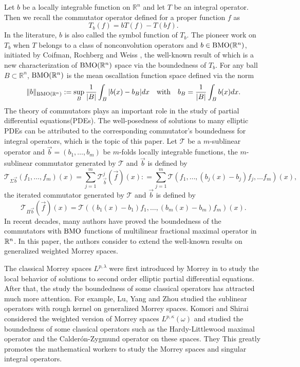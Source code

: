 \documentclass[11pt, twoside, leqno]{article}
\begin{document}
Let $b$ be a locally integrable function on $\mathbb{R}^{n}$ and let $T$ be an integral operator. Then we recall the commutator operator defined for a proper function $f$ as
$$T_{b}(f)=bT(f)-T(bf).$$
In the literature, $b$ is also called the symbol function of $T_{b}$.  The pioneer work on $T_{b}$ when $T$ belongs to a class of nonconvolution operators and $b\in {\rm BMO}(\mathbb{R}^{n})$, initiated by Coifman, Rochberg and Weiss \cite{Coifman1976Factorization}, the well-known result of which is a new characterization of ${\rm BMO}(\mathbb{R}^{n})$ space via the boundedness of $T_{b}$. For any ball $B\subset \mathbb{R}^{n}$, ${\rm BMO}(\mathbb{R}^{n})$ is the mean oscallation function space defined via the norm
$$\|b\|_{{\rm BMO}(\mathbb{R}^{n})}:=\sup_{B}\frac{1}{|B|}\int_{B}|b(x)-b_{B}|dx\quad\text{with}\quad b_{B}=\frac{1}{|B|}\int_{B}b(x)dx.$$
The theory of commutators plays an important role in the study of partial differential equations(PDEs).  The well-posedness of
solutions to many elliptic PDEs can be attributed to the corresponding commutator's boundedness for integral operators, which is the topic of this paper. Let $\mathcal{T}$ be a $m$-sublinear operator and  $\vec{b}=(b_1,\ldots,b_m)$ be $m$-folds locally integrable functions, the $m$-sublinear commutator generated by  $\mathcal{T}$ and $\vec{b}$ is defined by
\begin{equation*}
{\mathcal{T}_{\Sigma \vec b}}({f_1}, \ldots ,{f_m})(x) =\sum\limits_{j = 1}^m {\mathcal{T}_{\vec b}^j} (\vec f)(x): = \sum\limits_{j = 1}^m {\mathcal{T}({f_1}, \ldots ,({b_j}(x) - {b_j}){f_j}, \ldots {f_m})(x)},
\end{equation*}
the iterated commutator generated by  $\mathcal{T}$ and $\vec{b}$ is defined by
\begin{equation*}
{\mathcal{T}_{\Pi \vec b}}(\vec f)(x) = \mathcal{T}(({b_1}(x) - {b_1}){f_1}, \ldots ,({b_m}(x) - {b_m}){f_m})(x).
\end{equation*}
In recent decades, many authors have proved the boundedness of the commutators with $\rm{BMO}$ functions of multilinear fractional maximal operator in ${\mathbb R^n}$. In this paper, the authors consider to extend the well-known results on generalized weighted Morrey spaces. 

The classical Morrey spaces $L^{p,\lambda}$ were first introduced by Morrey in \cite{Morrey} to study the local behavior of solutions to second order elliptic partial differential equations. After that, the study the boundedness of some classical  operators has attracted much more attention. For example,  Lu, Yang and Zhou \cite{LuYangZhou} studied the sublinear operators with rough kernel on generalized Morrey spaces. Komori and Shirai \cite{Komori} considered the weighted version of Morrey spaces $L^{p,\kappa}(\omega)$ and studied the boundedness of some classical operators such as the Hardy-Littlewood maximal operator and the Calder\'on-Zygmund operator on these spaces. They This greatly promotes the mathematical workers to study the Morrey spaces and singular integral operators.
\end{document}
